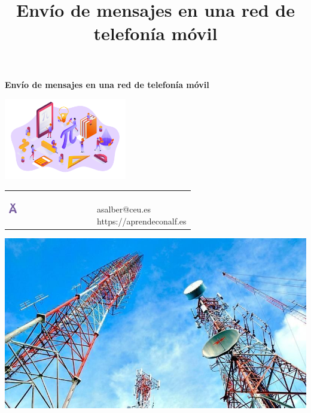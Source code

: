 \documentclass[
  a4paper,
]{scrreport}
\title{Envío de mensajes en una red de telefonía móvil}
\author{}
\date{}
\begin{document}
\begin{titlepage}

\begin{center}
\vspace*{5cm}

\Huge
{\textbf{\textsf{Envío de mensajes en una red de telefonía móvil}}}

\vspace{0.5cm}
\LARGE
{\textbf{\textsf{}}}

\vspace{1.5cm}

\includegraphics[width=0.4\textwidth]{../img/logos/proyectos.png}
\end{center}

\vfill

\begin{flushleft}
\begin{tabular}{ll}
\includegraphics[width=0.1\textwidth]{../img/logos/aprendeconalf.png} & \parbox[b]{5cm}{\Large\textsf{}\\ \textsf{asalber@ceu.es} \\ \textsf{https://aprendeconalf.es}}
\end{tabular}
\end{flushleft}
\end{titlepage}\ifdefined\Shaded\renewenvironment{Shaded}{\begin{tcolorbox}[frame hidden, borderline west={3pt}{0pt}{shadecolor}, boxrule=0pt, sharp corners, enhanced, interior hidden, breakable]}{\end{tcolorbox}}\fi

\includegraphics{../img/telefonia-movil/antenas.jpg}
\end{document}
